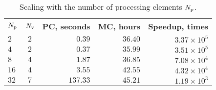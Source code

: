 \begin{table}
  \centering
  \caption{Scaling with the number of processing elements ${N_\text{p}}$.}
  \vspace{-10pt}
  \begin{tabular}{lcrrr}
    \toprule
    ${N_\text{p}}$ & ${N_\text{v}}$ & PC, seconds & MC, hours & Speedup, times \\
    \midrule
    $ 2$ & $2$ & $  0.39$ & $36.40$ & $3.37 \times 10^5$ \\
    $ 4$ & $2$ & $  0.37$ & $35.99$ & $3.51 \times 10^5$ \\
    $ 8$ & $4$ & $  1.87$ & $36.85$ & $7.08 \times 10^4$ \\
    $16$ & $4$ & $  3.55$ & $42.55$ & $4.32 \times 10^4$ \\
    $32$ & $7$ & $137.33$ & $45.21$ & $1.19 \times 10^3$ \\
    \bottomrule
  \end{tabular}
  \vspace{-10pt}
\end{table}
